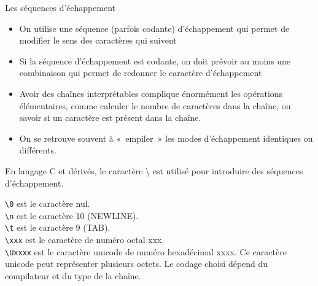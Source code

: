 \begin{frame}{Les séquences d'échappement}
  \begin{itemize}
  \item On utilise une séquence (parfois codante) d'échappement qui permet de
    modifier le sens des caractères qui suivent
  \item Si la séquence d'échappement est codante, on doit prévoir au moins une
    combinaison qui permet de redonner le caractère d'échappement
  \item Avoir des chaînes interprétables complique énormément les opérations
    élémentaires, comme calculer le nombre de caractères dans la chaîne, ou
    savoir si un caractère est présent dans la chaîne.
  \item[\dialogwarning] On se retrouve souvent à «~empiler~» les modes
    d'échappement identiques ou différents.
  \end{itemize}
  \begin{example}
    En langage C et dérivés, le caractère {\textbackslash} est utilisé pour
    introduire des séquences d'échappement.

    \texttt{\textbackslash 0} est le caractère nul.\\
    \texttt{\textbackslash n} est le caractère 10 (NEWLINE).\\
    \texttt{\textbackslash t} est le caractère 9 (TAB).\\
    \texttt{\textbackslash xxx} est le caractère de numéro octal xxx.\\
    \texttt{\textbackslash Uxxxx} est le caractère unicode de numéro
    hexadécimal xxxx. Ce caractère unicode peut représenter plusieurs
    octets. Le codage choisi dépend du compilateur et du type de la chaîne.
  \end{example}
\end{frame}
